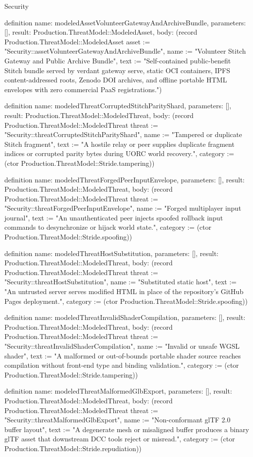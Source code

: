 \begin{lexlean}{Security}
\begin{semanticmodule}
definition{
  name: modeledAssetVolunteerGatewayAndArchiveBundle,
  parameters: [],
  result: Production.ThreatModel::ModeledAsset,
  body: (record Production.ThreatModel::ModeledAsset {asset := "Security::assetVolunteerGatewayAndArchiveBundle", name := "Volunteer Stitch Gateway and Public Archive Bundle", text := "Self-contained public-benefit Stitch bundle served by verdant gateway serve, static OCI containers, IPFS content-addressed roots, Zenodo DOI archives, and offline portable HTML envelopes with zero commercial PaaS registrations."})
}

definition{
  name: modeledThreatCorruptedStitchParityShard,
  parameters: [],
  result: Production.ThreatModel::ModeledThreat,
  body: (record Production.ThreatModel::ModeledThreat {threat := "Security::threatCorruptedStitchParityShard", name := "Tampered or duplicate Stitch fragment", text := "A hostile relay or peer supplies duplicate fragment indices or corrupted parity bytes during UORC world recovery.", category := (ctor Production.ThreatModel::Stride.tampering)})
}

definition{
  name: modeledThreatForgedPeerInputEnvelope,
  parameters: [],
  result: Production.ThreatModel::ModeledThreat,
  body: (record Production.ThreatModel::ModeledThreat {threat := "Security::threatForgedPeerInputEnvelope", name := "Forged multiplayer input journal", text := "An unauthenticated peer injects spoofed rollback input commands to desynchronize or hijack world state.", category := (ctor Production.ThreatModel::Stride.spoofing)})
}

definition{
  name: modeledThreatHostSubstitution,
  parameters: [],
  result: Production.ThreatModel::ModeledThreat,
  body: (record Production.ThreatModel::ModeledThreat {threat := "Security::threatHostSubstitution", name := "Substituted static host", text := "An untrusted server serves modified HTML in place of the repository's GitHub Pages deployment.", category := (ctor Production.ThreatModel::Stride.spoofing)})
}

definition{
  name: modeledThreatInvalidShaderCompilation,
  parameters: [],
  result: Production.ThreatModel::ModeledThreat,
  body: (record Production.ThreatModel::ModeledThreat {threat := "Security::threatInvalidShaderCompilation", name := "Invalid or unsafe WGSL shader", text := "A malformed or out-of-bounds portable shader source reaches compilation without front-end type and binding validation.", category := (ctor Production.ThreatModel::Stride.tampering)})
}

definition{
  name: modeledThreatMalformedGlbExport,
  parameters: [],
  result: Production.ThreatModel::ModeledThreat,
  body: (record Production.ThreatModel::ModeledThreat {threat := "Security::threatMalformedGlbExport", name := "Non-conformant glTF 2.0 buffer layout", text := "A degenerate mesh or misaligned buffer produces a binary glTF asset that downstream DCC tools reject or misread.", category := (ctor Production.ThreatModel::Stride.repudiation)})
}


\end{semanticmodule}
\end{lexlean}
